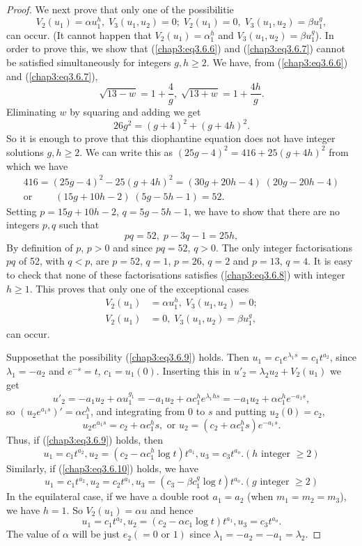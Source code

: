 \begin{proof}
We next prove that only one of the possibilitie
$$
V_2 (u_1) = \alpha u^h_1, \; V_3 (u_1, u_2) = 0 ; \; V_2 (u_1) = 0, \;
V_3 (u_1, u_2) = \beta u^g_1,  
$$
can occur. (It cannot happen that $V_2 (u_1) = \alpha^h_1$ and $V_3
(u_1, u_2) = \beta u^g_1$). In order to prove this, we show that
(\ref{chap3:eq3.6.6}) and (\ref{chap3:eq3.6.7}) cannot be satisfied
simultaneously for integers $g, h \geq 2$. We have, from
(\ref{chap3:eq3.6.6}) and (\ref{chap3:eq3.6.7}),  
$$
\sqrt{13-w} =1 + \frac{4}{g} ,\; \sqrt{13+w} = 1 + \frac{4h}{g}.
$$\pageoriginale
Eliminating $w$ by squaring and adding we get
$$
26 g^2 = (g+4)^2 + (g+4h)^2.
$$
So it is enough to prove that this diophantine equation does not have
integer solutions $g, h \geq 2$. We can write this as $(25 g - 4)^2 =
416 + 25 (g+4h)^2$ from which we have  
\begin{gather*}
416 =(25g - 4)^2 -25 (g+4h)^2 = (30g + 20 h -4) \; (20 g - 20 h - 4)\\
\text{or } \qquad (15 g + 10 h -2) \; (5g - 5h -1) = 52.
\end{gather*}
Setting $p=15 g + 10 h - 2$, $q = 5g  - 5h-1$, we have to show that
there are no integers $p,q$ such that  
\begin{equation*}
pq = 52, \; p-3q -1 = 25h,\tag{3.6.8}\label{chap3:eq3.6.8}
\end{equation*}
By definition of $p$, $p>0$ and since $pq = 52$, $q > 0$. The only
integer factorisations $pq$ of 52, with $q<p$, are $p=52$, $q=1$,
$p=26$, $q=2$ and $p=13$, $q=4$. It is easy to check that none of
these factorisations satisfies (\ref{chap3:eq3.6.8}) with integer $h
\geq 1$. This proves that only one of the exceptional cases 
\begin{align*}
V_2 (u_1) & = \alpha u^h_1, \; V_3 (u_1, u_2) = 0;  \tag{3.6.9}\label{chap3:eq3.6.9}\\
V_2 (u_1)& = 0, \; V_3 (u_1, u_2)  = \beta u^g_1, \tag{3.6.10}\label{chap3:eq3.6.10}
\end{align*}
can occur.

Suppose\pageoriginale that the possibility (\ref{chap3:eq3.6.9})
holds. Then $u_1 = c_1 e^{\lambda_1s} = c_1 t^{a_2}$, since $\lambda_1
= - a_2$ and $e^{-s} = t$, $c_1 = u_1(0)$. Inserting this in $u'_2 =
\lambda_2 u_2 + V_2 (u_1)$ we get 
$$
u'_2 = - a_1 u_2 + \alpha u^{g_1}_1 = - a_1 u_2 + \alpha c^{h}_1
e^{\lambda_1 hs} = - a_1 u_2 + \alpha c^{h}_1 e^{-a_1s},  
$$
so $(u_2 e^{a_1 s})' = \alpha c^h_1$, and integrating from 0 to $s$
and putting $u_2(0) = c_2$, 
$$
u_2 e^{a_1 s} = c_2 + \alpha c^h_1 s, \text{ or } u_2 = (c_2 + \alpha
c^h_1 s) e^{-a_1s}. 
$$
Thus, if (\ref{chap3:eq3.6.9}) holds, then
$$
u_1 = c_1 t^{a_2}, u_2 = (c_2 - \alpha c^h_1 \log t) t^{a_1}, u_3 =
c_3 t^{a_o}. (h \text{ integer } \geq 2) 
$$
Similarly, if (\ref{chap3:eq3.6.10}) holds, we have 
$$
u_1 = c_1 t^{a_2}, u_2 = c_2 t^{a_1}, u_3 = (c_3 - \beta c^g_1 \log t)
t^{a_o}. (g \text{ integer } \geq 2) 
$$
In the equilateral case, if we have a double root $a_1 = a_2$ (when
$m_1 = m_2 = m_3$), we have  $h=1$. So $V_2(u_1) = \alpha u$ and hence 
$$
u_1  = c_1 t^{a_2}, u_2 = (c_2 - \alpha c_1 \log t) t^{a_1}, u_3 = c_3 t^{a_o}.
$$
The value of $\alpha$ will be just $e_2 (=0 \text{ or }1)$ since
$\lambda_1 = - a_2 = - a_1 = \lambda_2$. 


\end{proof}
